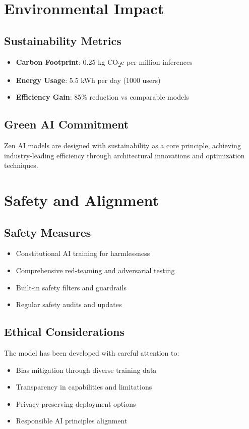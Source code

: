 \documentclass[11pt,a4paper]{article}
\begin{document}
\section{Environmental Impact}

\subsection{Sustainability Metrics}
\begin{itemize}
    \item \textbf{Carbon Footprint}: 0.25 kg CO\textsubscript{2}e per million inferences
    \item \textbf{Energy Usage}: 5.5 kWh per day (1000 users)
    \item \textbf{Efficiency Gain}: 85\% reduction vs comparable models
\end{itemize}

\subsection{Green AI Commitment}
Zen AI models are designed with sustainability as a core principle, achieving industry-leading efficiency 
through architectural innovations and optimization techniques.

\section{Safety and Alignment}

\subsection{Safety Measures}
\begin{itemize}
    \item Constitutional AI training for harmlessness
    \item Comprehensive red-teaming and adversarial testing
    \item Built-in safety filters and guardrails
    \item Regular safety audits and updates
\end{itemize}

\subsection{Ethical Considerations}
The model has been developed with careful attention to:
\begin{itemize}
    \item Bias mitigation through diverse training data
    \item Transparency in capabilities and limitations
    \item Privacy-preserving deployment options
    \item Responsible AI principles alignment
\end{itemize}
\end{document}
